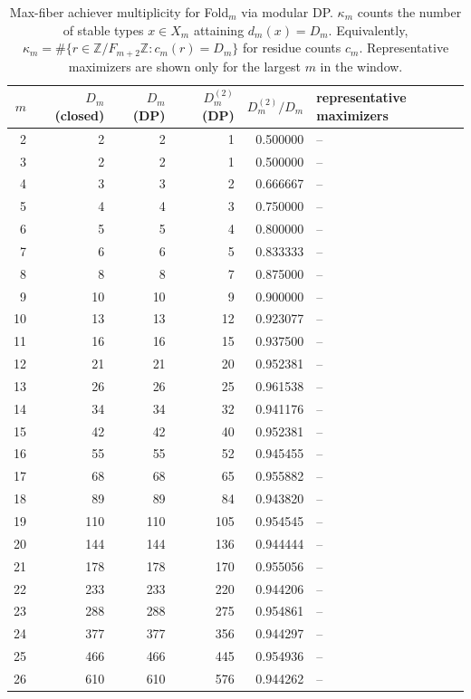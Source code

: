 \begin{table}[H]
\centering
\scriptsize
\setlength{\tabcolsep}{6pt}
\caption{Max-fiber achiever multiplicity for Fold$_m$ via modular DP. $\kappa_m$ counts the number of stable types $x\in X_m$ attaining $d_m(x)=D_m$. Equivalently, $\kappa_m=\#\{r\in\mathbb{Z}/F_{m+2}\mathbb{Z}: c_m(r)=D_m\}$ for residue counts $c_m$. Representative maximizers are shown only for the largest $m$ in the window.}
\label{tab:fold_max_fiber_achievers_phase}
\begin{tabular}{r r r r r l}
\toprule
$m$ & $D_m$ (closed) & $D_m$ (DP) & $D_m^{(2)}$ (DP) & $D_m^{(2)}/D_m$ & representative maximizers\\
\midrule
2 & 2 & 2 & 1 & 0.500000 & --\\
3 & 2 & 2 & 1 & 0.500000 & --\\
4 & 3 & 3 & 2 & 0.666667 & --\\
5 & 4 & 4 & 3 & 0.750000 & --\\
6 & 5 & 5 & 4 & 0.800000 & --\\
7 & 6 & 6 & 5 & 0.833333 & --\\
8 & 8 & 8 & 7 & 0.875000 & --\\
9 & 10 & 10 & 9 & 0.900000 & --\\
10 & 13 & 13 & 12 & 0.923077 & --\\
11 & 16 & 16 & 15 & 0.937500 & --\\
12 & 21 & 21 & 20 & 0.952381 & --\\
13 & 26 & 26 & 25 & 0.961538 & --\\
14 & 34 & 34 & 32 & 0.941176 & --\\
15 & 42 & 42 & 40 & 0.952381 & --\\
16 & 55 & 55 & 52 & 0.945455 & --\\
17 & 68 & 68 & 65 & 0.955882 & --\\
18 & 89 & 89 & 84 & 0.943820 & --\\
19 & 110 & 110 & 105 & 0.954545 & --\\
20 & 144 & 144 & 136 & 0.944444 & --\\
21 & 178 & 178 & 170 & 0.955056 & --\\
22 & 233 & 233 & 220 & 0.944206 & --\\
23 & 288 & 288 & 275 & 0.954861 & --\\
24 & 377 & 377 & 356 & 0.944297 & --\\
25 & 466 & 466 & 445 & 0.954936 & --\\
26 & 610 & 610 & 576 & 0.944262 & --\\

\end{tabular}
\end{table}
